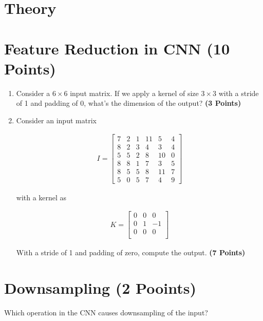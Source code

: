 \documentclass[12pt, xcolor=dvipsnames,svgnames,x11names]{article}
\begin{document}
\section*{Theory}

\section{Feature Reduction in CNN \hfill (10 Points)}

\begin{enumerate}
\item 

Consider a $6\times 6$ input matrix. If we apply a kernel of size $3\times3$ with a stride of 1 and padding of 0, what's the dimension of the output? \hfill \textbf{(3 Points)}

\item 

Consider an input matrix

\begin{align*}
I = \begin{bmatrix}
  7 & 2 & 1 & 11 & 5 & 4 \\
  8 & 2 & 3 & 4 & 3 & 4 \\
  5 & 5 & 2 & 8 & 10 & 0 \\
  8 & 8 & 1 & 7 & 3 & 5 \\
  8 & 5 & 5 & 8 & 11 & 7 \\
  5 & 0 & 5 & 7 & 4 & 9
\end{bmatrix}
\end{align*}


with a kernel as

\begin{align*}
K = \begin{bmatrix}
0 & 0 & 0\\
0 & 1 & -1\\
0 & 0 & 0\\
\end{bmatrix}
\end{align*}


With a stride of 1 and padding of zero, compute the output. \hfill \textbf{(7 Points)}


\end{enumerate}


\section{Downsampling \hfill (2 Pooints)}

Which operation in the CNN causes downsampling of the input?
\end{document}
